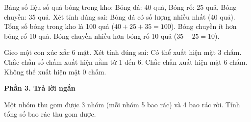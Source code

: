 \begin{ex} %
Bảng số liệu số quả bóng trong kho: Bóng đá: 40 quả, Bóng rổ: 25 quả, Bóng chuyền: 35 quả. Xét tính đúng sai:
\choiceTF
{\True Bóng đá có số lượng nhiều nhất (40 quả).}
{\True Tổng số bóng trong kho là 100 quả ($40 + 25 + 35 = 100$).}
{Bóng chuyền ít hơn bóng rổ 10 quả.}
{\True Bóng chuyền nhiều hơn bóng rổ 10 quả ($35 - 25 = 10$).}
\end{ex}

\begin{ex} %
Gieo một con xúc xắc 6 mặt. Xét tính đúng sai:
\choiceTF
{\True Có thể xuất hiện mặt 3 chấm.}
{\True Chắc chắn số chấm xuất hiện nằm từ 1 đến 6.}
{Chắc chắn xuất hiện mặt 6 chấm.}
{\True Không thể xuất hiện mặt 0 chấm.}
\end{ex}

\textbf{Phần 3. Trả lời ngắn}

\begin{ex} %
Một nhóm thu gom được 3 nhóm (mỗi nhóm 5 bao rác) và 4 bao rác rời. Tính tổng số bao rác thu gom được.
\end{ex}

